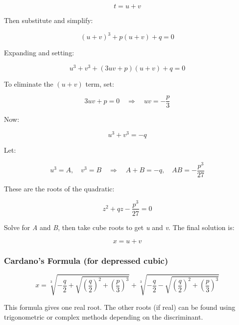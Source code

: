 \[
    t = u + v
\]

Then substitute and simplify:

\[
    {(u+v)}^3 + p(u+v) + q = 0
\]

Expanding and setting:

\[
    u^3 + v^3 + (3uv + p)(u+v) + q = 0
\]

To eliminate the \((u+v)\) term, set:

\[
    3uv + p = 0 \quad \Rightarrow \quad uv = -\frac{p}{3}
\]

Now:

\[
    u^3 + v^3 = -q
\]

Let:

\[
    u^3 = A, \quad v^3 = B \quad \Rightarrow \quad A + B = -q, \quad AB = -\frac{p^3}{27}
\]

These are the roots of the quadratic:

\[
    z^2 + qz - \frac{p^3}{27} = 0
\]

Solve for \emph{A} and \emph{B}, then take cube roots to get \emph{u} and \emph{v}. The final solution is:

\[
    x = u + v
\]

\subsubsection{Cardano’s Formula (for depressed cubic)}

\[
    x = \sqrt[3]{-\frac{q}{2} + \sqrt{{\left(\frac{q}{2}\right)}^2 + {\left(\frac{p}{3}\right)}^3}} + 
    \sqrt[3]{-\frac{q}{2} - \sqrt{{\left(\frac{q}{2}\right)}^2 + {\left(\frac{p}{3}\right)}^3}}
\]

This formula gives one real root. The other roots (if real) can be found using trigonometric or complex 
methods depending on the discriminant.


